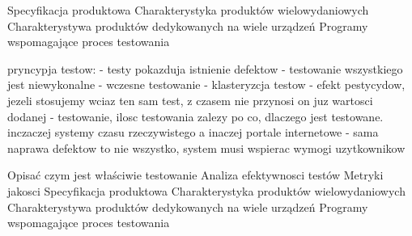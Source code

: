 Specyfikacja produktowa
	Charakterystyka produktów wielowydaniowych
	Charakterystywa produktów dedykowanych na wiele urządzeń
Programy wspomagające proces testowania


pryncypja testow:
- testy pokazduja istnienie defektow
- testowanie wszystkiego jest niewykonalne
- wczesne testowanie
- klasteryzcja testow
- efekt pestycydow, jezeli stosujemy wciaz ten sam test, z czasem nie przynosi on juz wartosci dodanej
- testowanie, ilosc testowania zalezy po co, dlaczego jest testowane. inczaczej systemy czasu rzeczywistego a inaczej portale internetowe
- sama naprawa defektow to nie wszystko, system musi wspierac wymogi uzytkownikow


Opisać czym jest właściwie testowanie
Analiza efektywnosci testów
Metryki jakosci
Specyfikacja produktowa
	Charakterystyka produktów wielowydaniowych
	Charakterystywa produktów dedykowanych na wiele urządzeń
Programy wspomagające proces testowania
